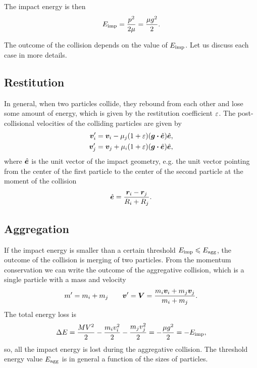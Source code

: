 \documentclass[aps,prl,preprint,groupedaddress,10pt]{revtex4-2}
\begin{document}
The impact energy is then
\begin{equation}
    E_{\mathrm{imp}}=\frac{p^2}{2\mu}=\frac{\mu g^2}{2}.
\end{equation}

The outcome of the collision depends on the value of $E_{\mathrm{imp}}$. Let us discuss each 
case in more details.

\subsection{Restitution}
In general, when two particles collide, they rebound from each other and lose some amount
of energy, which is given by the restitution coefficient $\varepsilon$. The post-collisional 
velocities of the colliding particles are given by
\begin{equation}
    \begin{split}
        \bv_i'&=\bv_i-\mu_j\pqty{1+\eps}\pqty{\bg\vdot\be}\be,\\
        \bv_j'&=\bv_j+\mu_i\pqty{1+\eps}\pqty{\bg\vdot\be}\be,
    \end{split}
\end{equation}
where $\hat{\vb*{e}}$ is the unit vector of the impact geometry, e.g. the unit vector pointing 
from the center of the first particle to the center of the second particle at the moment
of the collision
\begin{equation}
    \hat{\vb*{e}}=\frac{\vb*{r}_i-\vb*{r}_j}{R_i+R_j}.
\end{equation}

\subsection{Aggregation}
If the impact energy is smaller than a certain threshold 
$E_{\mathrm{imp}}\leqslant E_{\mathrm{agg}}$, the outcome of the collision is merging of two 
particles. From the momentum conservation we can write the outcome of the aggregative 
collision, which is a single particle with a mass and velocity
\begin{equation}
    m'=m_i+m_j\qquad\vb*{v}'=\vb*{V}=\frac{m_i\vb*{v}_i+m_j\vb*{v}_j}{m_i+m_j}.
\end{equation}
The total energy loss is 
\begin{equation}    
        \Delta E=\frac{MV^2}{2}-\frac{m_iv_i^2}{2}-\frac{m_jv_j^2}{2}
        =-\frac{\mu g^2}{2}=-E_{\mathrm{imp}},
\end{equation}
so, all the impact energy is lost during the aggregative collision.
The threshold energy value $E_{\mathrm{agg}}$ is in general a function of the sizes of 
particles.
\end{document}

